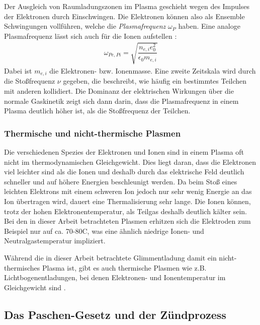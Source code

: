 Der Ausgleich von Raumladungszonen im Plasma geschieht wegen des Impulses der Elektronen durch Einschwingen. Die Elektronen können also als Ensemble Schwingungen vollführen, welche die \textit{Plasmafrequenz} $ \omega_{P} $ haben. Eine analoge Plasmafrequenz lässt sich auch für die Ionen aufstellen \cite{pielPlasmaPhysicsIntroduction2010}:
\begin{align*}
	\omega_{Pe,Pi} = \sqrt{ \dfrac{n_{e,i} e_0^2}{\epsilon_0m_{e,i}}}
\end{align*}
Dabei ist $ m_{e,i} $ die Elektronen- bzw. Ionenmasse.
Eine zweite Zeitskala wird durch die Stoßfrequenz $ \nu $ gegeben, die beschreibt, wie häufig ein bestimmtes Teilchen mit anderen kollidiert. Die Dominanz der elektrischen Wirkungen über die normale Gaskinetik zeigt sich dann darin, dass die Plasmafrequenz in einem Plasma deutlich höher ist, als die Stoßfrequenz der Teilchen.

\subsubsection{Thermische und nicht-thermische Plasmen}

Die verschiedenen Spezies der Elektronen und Ionen sind in einem Plasma oft nicht im  thermodynamischen Gleichgewicht. Dies liegt daran, dass die Elektronen viel leichter sind als die Ionen und deshalb durch das elektrische Feld deutlich schneller und auf höhere Energien beschleunigt werden. Da beim Stoß eines leichten Elektrons mit einem schweren Ion jedoch nur sehr wenig Energie an das Ion übertragen wird, dauert eine Thermalisierung sehr lange. Die Ionen können, trotz der hohen Elektronentemperatur, als \glqq{}Teilgas\grqq{} deshalb deutlich kälter sein. Bei den in dieser Arbeit betrachteten Plasmen erhitzen sich die Elektroden zum Beispiel nur auf ca. 70-80\Grad C, was eine ähnlich niedrige Ionen- und Neutralgastemperatur impliziert.

Während die in dieser Arbeit betrachtete Glimmentladung damit ein nicht-thermisches Plasma ist, gibt es auch thermische Plasmen wie z.B. Lichtbogenentladungen, bei denen Elektronen- und Ionentemperatur im Gleichgewicht sind \cite{keudellVorlesungsskriptEinfuhrungPlasmaphysik2008}.



\subsection{Das Paschen-Gesetz und der Zündprozess}

